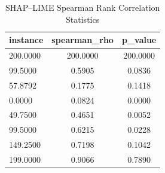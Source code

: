 \begin{table}
\centering
\caption{SHAP–LIME Spearman Rank Correlation Statistics}
\label{tab:agreement}
\begin{tabular}{lcc}
\toprule
instance & spearman_rho & p_value \\
\midrule
200.0000 & 200.0000 & 200.0000 \\
99.5000 & 0.5905 & 0.0836 \\
57.8792 & 0.1775 & 0.1418 \\
0.0000 & 0.0824 & 0.0000 \\
49.7500 & 0.4651 & 0.0052 \\
99.5000 & 0.6215 & 0.0228 \\
149.2500 & 0.7198 & 0.1042 \\
199.0000 & 0.9066 & 0.7890 \\
\bottomrule
\end{tabular}
\end{table}
